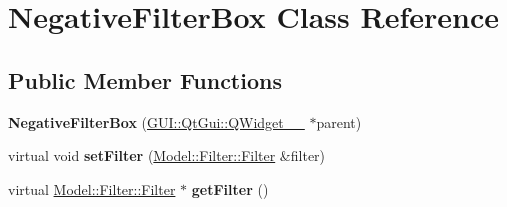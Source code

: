 \hypertarget{classGUI_1_1NegativeFilterBox}{}\section{Negative\+Filter\+Box Class Reference}
\label{classGUI_1_1NegativeFilterBox}
\subsection*{Public Member Functions}
\begin{DoxyCompactItemize}
\item 
\hypertarget{classGUI_1_1NegativeFilterBox_a2ad07b0952b276aee96502022e833cfb}{}{\bfseries Negative\+Filter\+Box} (\hyperlink{classGUI_1_1QtGui_1_1QWidget____10}{G\+U\+I\+::\+Qt\+Gui\+::\+Q\+Widget\+\_\+\+\_} $\ast$parent)\label{classGUI_1_1NegativeFilterBox_a2ad07b0952b276aee96502022e833cfb}

\item 
\hypertarget{classGUI_1_1NegativeFilterBox_ad7c0ee00fe3faac7942d75eec2a5342b}{}virtual void {\bfseries set\+Filter} (\hyperlink{classModel_1_1Filter_1_1Filter}{Model\+::\+Filter\+::\+Filter} \&filter)\label{classGUI_1_1NegativeFilterBox_ad7c0ee00fe3faac7942d75eec2a5342b}

\item 
\hypertarget{classGUI_1_1NegativeFilterBox_acef2029a93f4ab3a538cdb643b9c2613}{}virtual \hyperlink{classModel_1_1Filter_1_1Filter}{Model\+::\+Filter\+::\+Filter} $\ast$ {\bfseries get\+Filter} ()\label{classGUI_1_1NegativeFilterBox_acef2029a93f4ab3a538cdb643b9c2613}

\end{DoxyCompactItemize}
